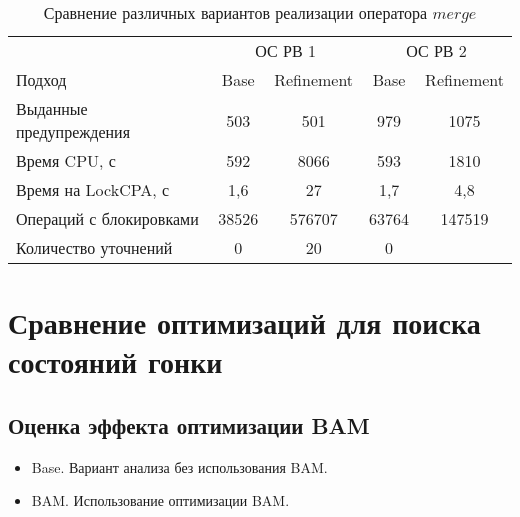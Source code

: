 \begin{center}
  \begin{table}[h]\footnotesize \centering
  	\label{table-drivers-lock-refinement}
    \caption{Сравнение различных вариантов реализации оператора $merge$}
    \begin{tabular}{ | l | c | c | c | c | }
      \hline
      		& 			 \multicolumn{2}{|c|}{ОС РВ 1} & 		\multicolumn{2}{|c|}{ОС РВ 2}\\
      Подход         					& Base  & Refinement  	& Base  & Refinement 	\\ \hline
      Выданные предупреждения			& 503   & 501    		& 979   & 1075  		\\ 
  	  Время CPU, с 						& 592   & 8066 			& 593   & 1810  		\\ 
  \hspace{0.5cm} Время на LockCPA, с	& 1,6   & 27    		& 1,7   & 4,8  			\\ \hline
      Операций с блокировками  			& 38526	& 576707   		& 63764 & 147519  		\\ 
      Количество уточнений  			& 0   	& 20   			& 0   	& \todo{2}  	\\ 
      \hline
    \end{tabular}
  \end{table}
\end{center}



\section{Сравнение оптимизаций для поиска состояний гонки}

\subsection{Оценка эффекта оптимизации BAM}

\begin{itemize}
\item Base. Вариант анализа без использования BAM.
\item BAM. Использование оптимизации BAM.
\end{itemize}

